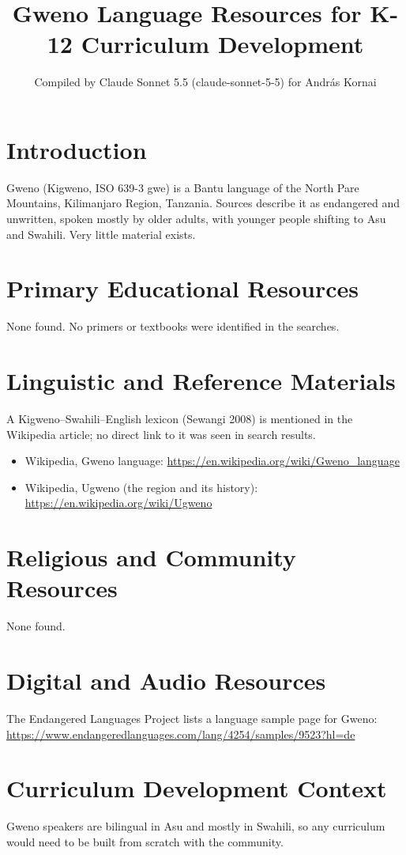 \documentclass[12pt]{article}
\title{Gweno Language Resources for K-12 Curriculum Development}
\author{Compiled by Claude Sonnet 5.5 (claude-sonnet-5-5) for Andr\'as Kornai}
\date{}
\begin{document}
\maketitle

\section{Introduction}
Gweno (Kigweno, ISO 639-3 gwe) is a Bantu language of the North Pare Mountains, Kilimanjaro Region, Tanzania. Sources describe it as endangered and unwritten, spoken mostly by older adults, with younger people shifting to Asu and Swahili. Very little material exists.

\section{Primary Educational Resources}
None found. No primers or textbooks were identified in the searches.

\section{Linguistic and Reference Materials}
A Kigweno--Swahili--English lexicon (Sewangi 2008) is mentioned in the Wikipedia article; no direct link to it was seen in search results.
\begin{itemize}
\item Wikipedia, Gweno language: \url{https://en.wikipedia.org/wiki/Gweno_language}
\item Wikipedia, Ugweno (the region and its history): \url{https://en.wikipedia.org/wiki/Ugweno}
\end{itemize}

\section{Religious and Community Resources}
None found.

\section{Digital and Audio Resources}
The Endangered Languages Project lists a language sample page for Gweno: \url{https://www.endangeredlanguages.com/lang/4254/samples/9523?hl=de}

\section{Curriculum Development Context}
Gweno speakers are bilingual in Asu and mostly in Swahili, so any curriculum would need to be built from scratch with the community.
\end{document}
